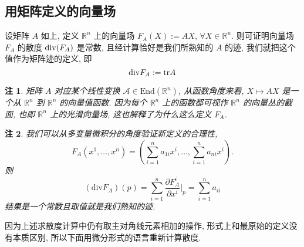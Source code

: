 \documentclass{book}
\newtheorem*{remark}{\indent 注}
\begin{document}
    \subsection{用矩阵定义的向量场}
        设矩阵  $A$ 如上, 定义 $\mathbb{R}^n$ 上的向量场 $F_A(X) := AX,\,\forall X\in\mathbb{R}^n$.
        则可证明向量场 $F_A$ 的散度 ${\rm div}(F_A)$ 是常数, 且经计算恰好是我们所熟知的 $A$ 的迹, 我们就把这个值作为矩阵迹的定义, 即
        \begin{equation*}
            {\rm div}F_A := {\rm tr}A
        \end{equation*}
        \begin{remark}
            矩阵 $A$ 对应某个线性变换 $\mathcal{A}\in\mathrm{End}(\mathbb{R}^n)$, 从函数角度来看,   $X\mapsto AX$ 是一个从 $\mathbb{R}^n$ 到 $\mathbb{R}^n$ 的向量值函数.
            因为每个 $\mathbb{R}^n$ 上的函数都可视作 $\mathbb{R}^n$ 的向量丛的截面, 也即 $\mathbb{R}^n$ 上的光滑向量场, 这也解释了为什么这么定义 $F_A$.
        \end{remark}
        \begin{remark}
            我们可以从多变量微积分的角度验证新定义的合理性,
            \begin{equation*}
                F_A(x^1,\dots,x^n) = (\sum_{i=1}^{n}a_{1i}x^i,\dots,\sum_{i=1}^{n}a_{ni}x^i).
            \end{equation*}
            则
            \begin{equation*}
                (\mathrm{div} F_A)(p) = \sum_{i=1}^{n}\frac{\partial F_A^i}{\partial x^i}\Bigg|_p = \sum_{i=1}^{n}a_{ii}
            \end{equation*}
            结果是一个常数且取值就是我们熟知的迹.
        \end{remark}
        因为上述求散度计算中仍有取主对角线元素相加的操作, 形式上和最原始的定义没有本质区别, 所以下面用微分形式的语言重新计算散度.
\end{document}
